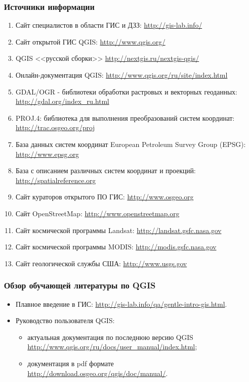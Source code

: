 

\begin{frame}[allowframebreaks]
    \frametitle{Источники информации}
    \begin{enumerate}
        \item Сайт специалистов в области         ГИС и ДЗЗ: \url{http://gis-lab.info/}
        \item Сайт открытой ГИС QGIS: \url{http://www.qgis.org/}
        \item QGIS <<русской сборки>> \url{http://nextgis.ru/nextgis-qgis/}
        \item Онлайн-документация QGIS: \url{http://www.qgis.org/ru/site/index.html}
        \item GDAL/OGR - библиотеки обработки         растровых и векторных геоданных:        \url{http://gdal.org/index_ru.html}
        \item PROJ.4: библиотека для        выполнения преобразований систем         координат: \url{http://trac.osgeo.org/proj}
        \item База данных систем координат     European Petroleum Survey Group (EPSG):        \url{http://www.epsg.org}
        \item База с описанием различных         систем координат и проекций:    \url{http://spatialreference.org}
        \item Сайт кураторов открытого ПО    ГИС: \url{http://www.osgeo.org}
        \item Сайт OpenStreetMap:  \url{http://www.openstreetmap.org}
        \item Сайт космической программы Landsat: \url{http://landsat.gsfc.nasa.gov}
        \item Сайт космической программы MODIS: \url{http://modis.gsfc.nasa.gov}
        \item Сайт геологической службы США: \url{http://www.usgs.gov}
    \end{enumerate}
\end{frame}

\begin{frame}
    \frametitle{Обзор обучающей литературы по QGIS}
    \begin{itemize}
        \item Плавное введение в ГИС: \url{http://gis-lab.info/qa/gentle-intro-gis.html}.
        \item Руководство пользователя QGIS:
            \begin{itemize}
                \item актуальная документация по последнюю версию QGIS \url{http://www.qgis.org/ru/docs/user_manual/index.html};
                \item документация в pdf формате \url{http://download.osgeo.org/qgis/doc/manual/}.
            \end{itemize}
    \end{itemize}
\end{frame}


